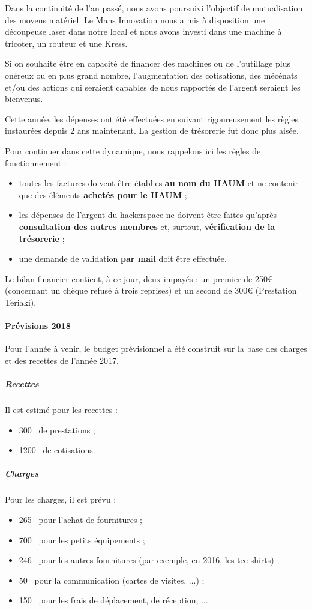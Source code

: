\documentclass[11pt]{article}
\begin{document}
Dans la continuité de l'an passé, nous avons poursuivi l'objectif de mutualisation
des moyens matériel. Le Mans Innovation nous a mis à disposition une découpeuse laser
dans notre local et nous avons investi dans une machine à tricoter, un routeur
et une Kress.

Si on souhaite être en capacité de financer des machines ou de l'outillage plus onéreux
ou en plus grand nombre, l'augmentation des cotisations, des mécénats et/ou des
actions qui seraient capables de nous rapportés de l'argent seraient les bienvenus.

Cette année, les dépenses ont été effectuées en suivant rigoureusement les règles
instaurées depuis 2 ans maintenant. La gestion de trésorerie fut donc plus aisée.

Pour continuer dans cette dynamique, nous rappelons ici les règles de fonctionnement :
\begin{itemize}
 \item toutes les factures doivent être établies \textbf{au nom du HAUM} et ne
 contenir que des éléments \textbf{achetés pour le HAUM} ;
 \item les dépenses de l'argent du hackerspace ne doivent être faites qu'après
 \textbf{consultation des autres membres} et, surtout, \textbf{vérification de la
 trésorerie} ;
 \item une demande de validation \textbf{par mail} doit être effectuée.
\end{itemize}

Le bilan financier contient, à ce jour, deux impayés : un premier de 250\euro{}
(concernant un chèque refusé à trois reprises) et un second de 300\euro{} (Prestation
Teriaki).

\paragraph{Prévisions 2018}
Pour l'année à venir, le budget prévisionnel a été construit sur la base des charges
et des recettes de l'année 2017.

\subparagraph{Recettes}
Il est estimé pour les recettes :
\begin{itemize}
 \item 300\officialeuro~ de prestations ;
 \item 1200\officialeuro~ de cotisations.
\end{itemize}

\subparagraph{Charges}
Pour les charges, il est prévu :
\begin{itemize}
 \item 265\officialeuro~ pour l'achat de fournitures ;
 \item 700\officialeuro~ pour les petits équipements ;
 \item 246\officialeuro~ pour les autres fournitures (par exemple, en 2016, les tee-shirts) ;
 \item 50\officialeuro~ pour la communication (cartes de visites, ...) ;
 \item 150\officialeuro~ pour les frais de déplacement, de réception, ...
\end{itemize}
\end{document}

